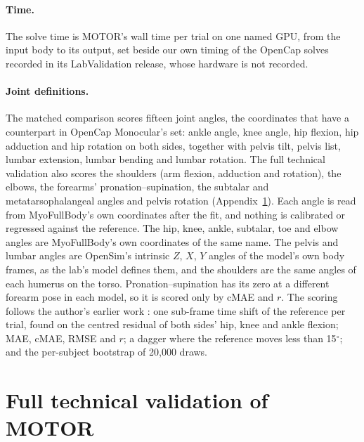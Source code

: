 \documentclass[11pt]{article}
\newcommand{\dg}{\ensuremath{^\circ}}
\begin{document}
\paragraph{Time.} The solve time is MOTOR's wall time per trial on one named GPU, from the input body to its output,
set beside our own timing of the OpenCap solves recorded in its LabValidation release, whose hardware is not
recorded.

\paragraph{Joint definitions.}
\label{app:joints}
The matched comparison scores fifteen joint angles, the coordinates that have a counterpart in OpenCap Monocular's
set: ankle angle, knee angle, hip flexion, hip adduction and hip rotation on both sides, together with pelvis tilt,
pelvis list, lumbar extension, lumbar bending and lumbar rotation. The full technical validation also scores the
shoulders (arm flexion, adduction and rotation), the elbows, the forearms' pronation--supination, the subtalar and
metatarsophalangeal angles and pelvis rotation (Appendix~\ref{app:motor}). Each angle is read from MyoFullBody's own
coordinates after the fit, and nothing is calibrated or regressed against the reference. The hip, knee, ankle,
subtalar, toe and elbow angles are MyoFullBody's own coordinates of the same name. The pelvis and lumbar angles are
OpenSim's intrinsic $Z$, $X$, $Y$ angles of the model's own body frames, as the lab's model defines them, and the
shoulders are the same angles of each humerus on the torso. Pronation--supination has its zero at a different forearm
pose in each model, so it is scored only by cMAE and $r$. The scoring follows the author's earlier work
\cite{kardolus2026direct}: one sub-frame time shift of the reference per trial, found on the centred residual of both
sides' hip, knee and ankle flexion; MAE, cMAE, RMSE and $r$; a dagger where the reference moves less than 15\dg; and
the per-subject bootstrap of 20{,}000 draws.


\section{Full technical validation of MOTOR}
\label{app:motor}
\end{document}
